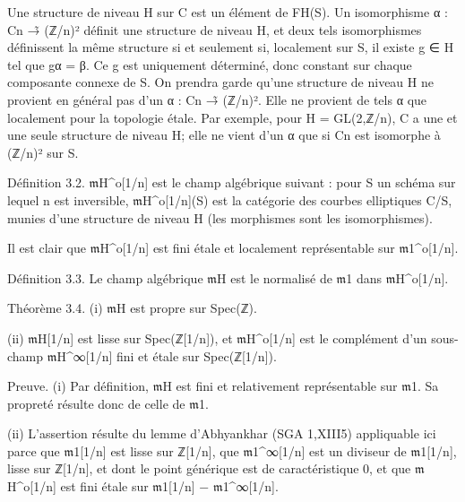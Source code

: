 \documentclass[11pt,a4paper]{article}
\begin{document}
Une structure de niveau H sur C est un élément de F\textunderscore{}H(S). Un isomorphisme α : C\textunderscore{}n →̃ (ℤ/n)² définit une structure de niveau H, et deux tels isomorphismes définissent la même structure si et seulement si, localement sur S, il existe g ∈ H tel que gα = β. Ce g est uniquement déterminé, donc constant sur chaque composante connexe de S. On prendra garde qu'une structure de niveau H ne provient en général pas d'un α : C\textunderscore{}n →̃ (ℤ/n)². Elle ne provient de tels α que localement pour la topologie étale. Par exemple, pour H = GL(2,ℤ/n), C a une et une seule structure de niveau H; elle ne vient d'un α que si C\textunderscore{}n est isomorphe à (ℤ/n)² sur S.

Définition 3.2. \ensuremath{\mathfrak{m}}\textunderscore{}H\textasciicircum{}o[1/n] est le champ algébrique suivant : pour S un schéma sur lequel n est inversible, \ensuremath{\mathfrak{m}}\textunderscore{}H\textasciicircum{}o[1/n](S) est la catégorie des courbes elliptiques C/S, munies d'une structure de niveau H (les morphismes sont les isomorphismes).

Il est clair que \ensuremath{\mathfrak{m}}\textunderscore{}H\textasciicircum{}o[1/n] est fini étale et localement représentable sur \ensuremath{\mathfrak{m}}\textunderscore{}1\textasciicircum{}o[1/n].

Définition 3.3. Le champ algébrique \ensuremath{\mathfrak{m}}\textunderscore{}H est le normalisé de \ensuremath{\mathfrak{m}}\textunderscore{}1 dans \ensuremath{\mathfrak{m}}\textunderscore{}H\textasciicircum{}o[1/n].

Théorème 3.4. (i) \ensuremath{\mathfrak{m}}\textunderscore{}H est propre sur Spec(ℤ).

(ii) \ensuremath{\mathfrak{m}}\textunderscore{}H[1/n] est lisse sur Spec(ℤ[1/n]), et \ensuremath{\mathfrak{m}}\textunderscore{}H\textasciicircum{}o[1/n] est le complément d'un sous-champ \ensuremath{\mathfrak{m}}\textunderscore{}H\textasciicircum{}∞[1/n] fini et étale sur Spec(ℤ[1/n]).

Preuve. (i) Par définition, \ensuremath{\mathfrak{m}}\textunderscore{}H est fini et relativement représentable sur \ensuremath{\mathfrak{m}}\textunderscore{}1. Sa propreté résulte donc de celle de \ensuremath{\mathfrak{m}}\textunderscore{}1.

(ii) L'assertion résulte du lemme d'Abhyankhar (SGA 1,XIII5) appliquable ici parce que \ensuremath{\mathfrak{m}}\textunderscore{}1[1/n] est lisse sur ℤ[1/n], que \ensuremath{\mathfrak{m}}\textunderscore{}1\textasciicircum{}∞[1/n] est un diviseur de \ensuremath{\mathfrak{m}}\textunderscore{}1[1/n], lisse sur ℤ[1/n], et dont le point générique est de caractéristique 0, et que \ensuremath{\mathfrak{m}}\textunderscore{}H\textasciicircum{}o[1/n] est fini étale sur \ensuremath{\mathfrak{m}}\textunderscore{}1[1/n] − \ensuremath{\mathfrak{m}}\textunderscore{}1\textasciicircum{}∞[1/n].
\end{document}

